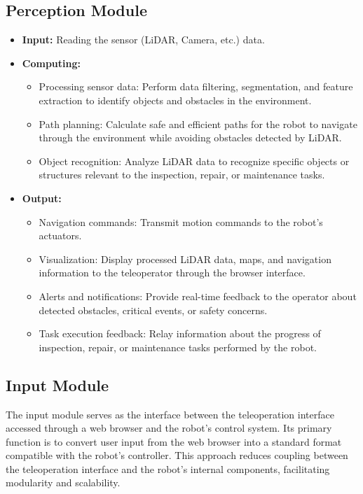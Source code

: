 \documentclass{article}
\begin{document}
\subsection{Perception Module}
\begin{itemize}
    \item \textbf{Input:} Reading the sensor (LiDAR, Camera, etc.) data.
    \item \textbf{Computing:}
    \begin{itemize}
        \item Processing sensor data: Perform data filtering, segmentation, and feature extraction to identify objects and obstacles in the environment.
        \item Path planning: Calculate safe and efficient paths for the robot to navigate through the environment while avoiding obstacles detected by LiDAR.
        \item Object recognition: Analyze LiDAR data to recognize specific objects or structures relevant to the inspection, repair, or maintenance tasks.
    \end{itemize}
    \item \textbf{Output:}
    \begin{itemize}
        \item Navigation commands: Transmit motion commands to the robot's actuators.
        \item Visualization: Display processed LiDAR data, maps, and navigation information to the teleoperator through the browser interface.
        \item Alerts and notifications: Provide real-time feedback to the operator about detected obstacles, critical events, or safety concerns.
        \item Task execution feedback: Relay information about the progress of inspection, repair, or maintenance tasks performed by the robot.
    \end{itemize}
\end{itemize}

\subsection{Input Module}
The input module serves as the interface between the teleoperation interface accessed through a web browser and the robot's control system. Its primary function is to convert user input from the web browser into a standard format compatible with the robot's controller. This approach reduces coupling between the teleoperation interface and the robot's internal components, facilitating modularity and scalability.
\end{document}
